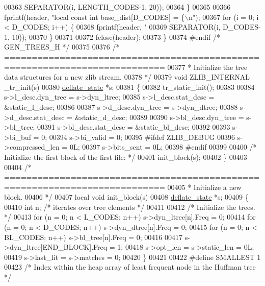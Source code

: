 \begin{DoxyCode}
{{{{{{{{00363                 SEPARATOR(i, LENGTH\_CODES-1, 20));
00364     \}
00365 
00366     fprintf(header, \textcolor{stringliteral}{"local const int base\_dist[D\_CODES] = \{\(\backslash\)n"});
00367     \textcolor{keywordflow}{for} (i = 0; i < D\_CODES; i++) \{
00368         fprintf(header, \textcolor{stringliteral}{"%
00369                 SEPARATOR(i, D\_CODES-1, 10));
00370     \}
00371 
00372     fclose(header);
00373 \}
00374 \textcolor{preprocessor}{#endif }\textcolor{comment}{/* GEN\_TREES\_H */}\textcolor{preprocessor}{}
00375 
00376 \textcolor{comment}{/* ===========================================================================}
00377 \textcolor{comment}{ * Initialize the tree data structures for a new zlib stream.}
00378 \textcolor{comment}{ */}
00379 \textcolor{keywordtype}{void} ZLIB\_INTERNAL \_tr\_init(s)
00380     \hyperlink{structinternal__state}{deflate\_state} *s;
00381 \{
00382     tr\_static\_init();
00383 
00384     s->l\_desc.dyn\_tree = s->dyn\_ltree;
00385     s->l\_desc.stat\_desc = &static\_l\_desc;
00386 
00387     s->d\_desc.dyn\_tree = s->dyn\_dtree;
00388     s->d\_desc.stat\_desc = &static\_d\_desc;
00389 
00390     s->bl\_desc.dyn\_tree = s->bl\_tree;
00391     s->bl\_desc.stat\_desc = &static\_bl\_desc;
00392 
00393     s->bi\_buf = 0;
00394     s->bi\_valid = 0;
00395 \textcolor{preprocessor}{#ifdef ZLIB\_DEBUG}
00396     s->compressed\_len = 0L;
00397     s->bits\_sent = 0L;
00398 \textcolor{preprocessor}{#endif}
00399 
00400     \textcolor{comment}{/* Initialize the first block of the first file: */}
00401     init\_block(s);
00402 \}
00403 
00404 \textcolor{comment}{/* ===========================================================================}
00405 \textcolor{comment}{ * Initialize a new block.}
00406 \textcolor{comment}{ */}
00407 local \textcolor{keywordtype}{void} init\_block(s)
00408     \hyperlink{structinternal__state}{deflate\_state} *s;
00409 \{
00410     \textcolor{keywordtype}{int} n; \textcolor{comment}{/* iterates over tree elements */}
00411 
00412     \textcolor{comment}{/* Initialize the trees. */}
00413     \textcolor{keywordflow}{for} (n = 0; n < L\_CODES;  n++) s->dyn\_ltree[n].Freq = 0;
00414     for (n = 0; n < D\_CODES;  n++) s->dyn\_dtree[n].Freq = 0;
00415     for (n = 0; n < BL\_CODES; n++) s->bl\_tree[n].Freq = 0;
00416 
00417     s->dyn\_ltree[END\_BLOCK].Freq = 1;
00418     s->opt\_len = s->static\_len = 0L;
00419     s->last\_lit = s->matches = 0;
00420 \}
00421 
00422 \textcolor{preprocessor}{#define SMALLEST 1}
00423 \textcolor{comment}{/* Index within the heap array of least frequent node in the Huffman tree */}
}}}}}}}}}
\end{DoxyCode}
